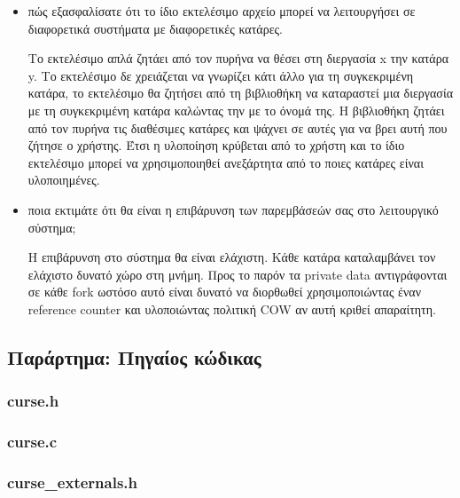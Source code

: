 \documentclass[a4paper,11pt]{article} \usepackage{anysize}
\begin{document}
\begin{itemize}
    \item πώς εξασφαλίσατε ότι το ίδιο εκτελέσιμο αρχείο μπορεί να λειτουργήσει σε διαφορετικά συστήματα με διαφορετικές κατάρες.

        Το εκτελέσιμο απλά ζητάει από τον πυρήνα να θέσει στη διεργασία x την
        κατάρα y. Το εκτελέσιμο δε χρειάζεται να γνωρίζει κάτι άλλο για τη
        συγκεκριμένη κατάρα, το εκτελέσιμο θα ζητήσει από τη βιβλιοθήκη να
        καταραστεί μια διεργασία με τη συγκεκριμένη κατάρα καλώντας την
        με το όνομά της. Η βιβλιοθήκη ζητάει από τον πυρήνα τις διαθέσιμες
        κατάρες και ψάχνει σε αυτές για να βρει αυτή που ζήτησε ο χρήστης.
        Έτσι η υλοποίηση κρύβεται από το χρήστη και το ίδιο εκτελέσιμο μπορεί 
        να χρησιμοποιηθεί ανεξάρτητα από το ποιες κατάρες είναι υλοποιημένες.

    \item ποια εκτιμάτε ότι θα είναι η επιβάρυνση των παρεμβάσεών σας στο λειτουργικό σύστημα;

        Η επιβάρυνση στο σύστημα θα είναι ελάχιστη. Κάθε κατάρα καταλαμβάνει
        τον ελάχιστο δυνατό χώρο στη μνήμη. Προς το παρόν τα private data
        αντιγράφονται σε κάθε fork ωστόσο αυτό είναι δυνατό να διορθωθεί
        χρησιμοποιώντας έναν reference counter και υλοποιώντας πολιτική COW αν
        αυτή κριθεί απαραίτητη. 

\end{itemize}

\pagebreak

\subsection*{Παράρτημα: Πηγαίος κώδικας}


\subsubsection*{curse.h}

\subsubsection*{curse.c}


\subsubsection*{curse\_externals.h}

\end{document}
